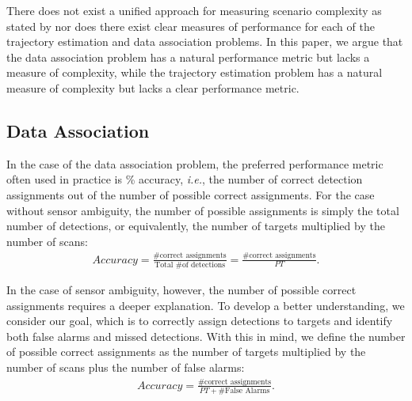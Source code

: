 There does not exist a unified approach for measuring scenario complexity as stated by \cite{MTT-Taxonomy} nor does there exist clear measures of performance for each of the trajectory estimation and data association problems. In this paper, we argue that the data association problem has a natural performance metric but lacks a measure of complexity, while the trajectory estimation problem has a natural measure of complexity but lacks a clear performance metric. 

\subsection{Data Association}
In the case of the data association problem, the preferred performance metric often used in practice is \% accuracy, \textit{i.e.}, the number of correct detection assignments out of the number of possible correct assignments. For the case without sensor ambiguity, the number of possible assignments is simply the total number of detections, or equivalently, the number of targets multiplied by the number of scans: 
\begin{align*}
Accuracy =  \frac{\text{\# correct assignments}}{\text{Total \# of detections}}= \frac{\text{\# correct assignments}}{PT}.
\end{align*}

In the case of sensor ambiguity, however, the number of possible correct assignments requires a deeper explanation. To develop a better understanding, we consider our goal, which is to correctly assign detections to targets and identify both false alarms and missed detections. With this in mind, we define the number of possible correct assignments as the number of targets multiplied by the number of scans plus the number of false alarms:
\begin{align*}
Accuracy =  \frac{\text{\# correct assignments}}{PT + \text{\# False Alarms}}.
\end{align*}

